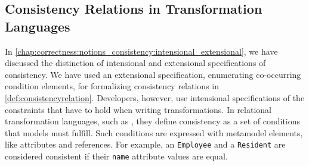 


\subsection{Consistency Relations in Transformation Languages}

In \autoref{chap:correctness:notions_consistency:intensional_extensional}, we have discussed the distinction of intensional and extensional specifications of consistency.
We have used an extensional specification, enumerating co-occurring condition elements, for formalizing consistency relations in \autoref{def:consistencyrelation}.
Developers, however, use intensional specifications of the constraints that have to hold when writing transformations.
In relational transformation languages, such as \qvtr, they define consistency as a set of conditions that models must fulfill.
Such conditions are expressed with metamodel elements, like attributes and references. 
For example, an \texttt{Employee} and a \texttt{Resident} are considered consistent if their \texttt{name} attribute values are equal.


